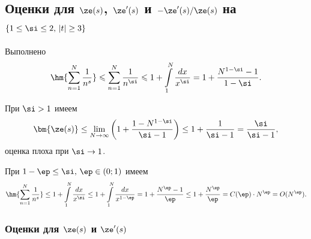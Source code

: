 \subsection{Оценки для $\ze(s)$, $\ze'(s)$ и $-\ze'(s)/\ze(s)$ на $\{1\le\si\le2,\,|t|\ge3\}$}

Выполнено
$$
  \hm{\sum_{n=1}^{N}\frac1{n^s}}\leqslant\sum_{n=1}^N\frac1{n^\si}\leqslant
	1+\intlim_1^N\frac{dx}{x^\si}=1+\frac{N^{1-\si}-1}{1-\si}.
$$

 При $\si>1$ имеем
\begin{equation}
  \label{zeta <= sigma/(sigma-1)}
  \bm{\ze(s)} \le \lim_{N\to\infty}\left(1+\frac{1-N^{1-\si}}{\si-1}\right) \le 
	1+\frac1{\si-1} = \frac{\si}{\si-1},
\end{equation}
оценка плоха при $\si\to1$.

 При $1-\ep\le\si,\,\ep\in(0;1)$ имеем
$$
  \hm{\sum_{n=1}^{N}\frac1{n^s}}\le1+\intlim_1^N\frac{dx}{x^\si}\le
	1+\intlim_1^N\frac{dx}{x^{1-\ep}}=1+\frac{N^\ep-1}{\ep}\le
	1+\frac{N^\ep}{\ep}=C(\ep)\cdot N^\ep=O(N^\ep).
$$

\subsubsection{Оценки для $\ze(s)$ и $\ze'(s)$}

